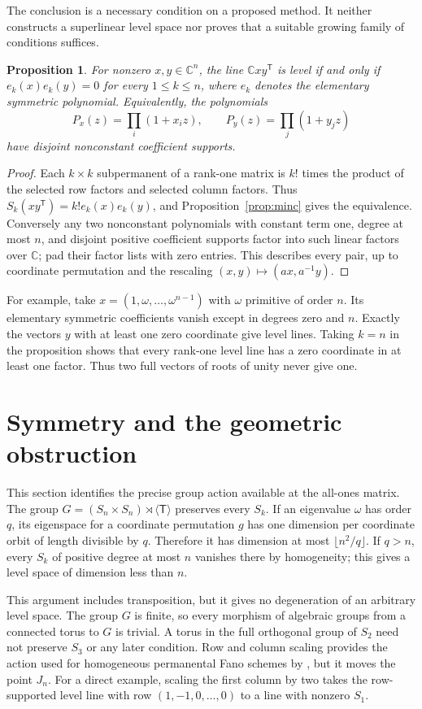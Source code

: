 \documentclass[11pt]{article}
\newcommand{\C}{\mathbb C}
\newtheorem{proposition}[theorem]{Proposition}
\theoremstyle{definition}
\theoremstyle{remark}
\begin{document}
The conclusion is a necessary condition on a proposed method. It neither constructs a superlinear level space nor proves that a suitable growing family of conditions suffices.

\begin{proposition}\label{prop:rankone}
For nonzero $x,y\in\C^n$, the line $\C xy^{\mathsf T}$ is level if and only if $e_k(x)e_k(y)=0$ for every $1\leq k\leq n$, where $e_k$ denotes the elementary symmetric polynomial. Equivalently, the polynomials
\[
 P_x(z)=\prod_i(1+x_i z),\qquad P_y(z)=\prod_j(1+y_jz)
\]
have disjoint nonconstant coefficient supports.
\end{proposition}
\begin{proof}
Each $k\times k$ subpermanent of a rank-one matrix is $k!$ times the product of the selected row factors and selected column factors. Thus $S_k(xy^{\mathsf T})=k!e_k(x)e_k(y)$, and Proposition~\ref{prop:minc} gives the equivalence. Conversely any two nonconstant polynomials with constant term one, degree at most $n$, and disjoint positive coefficient supports factor into such linear factors over $\C$; pad their factor lists with zero entries. This describes every pair, up to coordinate permutation and the rescaling $(x,y)\mapsto(ax,a^{-1}y)$.
\end{proof}
For example, take $x=(1,\omega,\ldots,\omega^{n-1})$ with $\omega$ primitive of order $n$. Its elementary symmetric coefficients vanish except in degrees zero and $n$. Exactly the vectors $y$ with at least one zero coordinate give level lines. Taking $k=n$ in the proposition shows that every rank-one level line has a zero coordinate in at least one factor. Thus two full vectors of roots of unity never give one.

\section{Symmetry and the geometric obstruction}\label{sec:symmetry}
This section identifies the precise group action available at the all-ones matrix.
The group $G=(S_n\times S_n)\rtimes\langle\mathsf T\rangle$ preserves every $S_k$. If an eigenvalue $\omega$ has order $q$, its eigenspace for a coordinate permutation $g$ has one dimension per coordinate orbit of length divisible by $q$. Therefore it has dimension at most $\lfloor n^2/q\rfloor$. If $q>n$, every $S_k$ of positive degree at most $n$ vanishes there by homogeneity; this gives a level space of dimension less than $n$.

This argument includes transposition, but it gives no degeneration of an arbitrary level space. The group $G$ is finite, so every morphism of algebraic groups from a connected torus to $G$ is trivial. A torus in the full orthogonal group of $S_2$ need not preserve $S_3$ or any later condition. Row and column scaling provides the action used for homogeneous permanental Fano schemes by \citet[Section~2.2, Proposition~2.3 and Remark~2.5]{CI}, but it moves the point $J_n$. For a direct example, scaling the first column by two takes the row-supported level line with row $(1,-1,0,\ldots,0)$ to a line with nonzero $S_1$.
\end{document}
